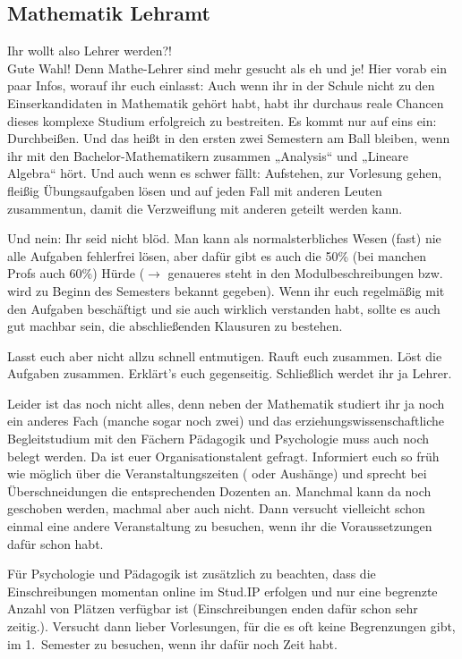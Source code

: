 \subsection{Mathematik Lehramt}

Ihr wollt also Lehrer werden?!\\
Gute Wahl! Denn Mathe-Lehrer sind mehr gesucht als eh und je! 
Hier vorab ein paar Infos, worauf ihr euch einlasst: Auch wenn ihr in der Schule nicht zu den Einserkandidaten in Mathematik gehört habt, habt ihr durchaus reale Chancen dieses komplexe Studium erfolgreich zu bestreiten.
Es kommt nur auf eins ein: Durchbeißen.
Und das heißt in den ersten zwei Semestern am Ball bleiben, wenn ihr mit den Bachelor-Mathematikern zusammen „Analysis“ und „Lineare Algebra“ hört.
Und auch wenn es schwer fällt:
Aufstehen, zur Vorlesung gehen, fleißig Übungsaufgaben lösen und auf jeden Fall mit anderen Leuten zusammentun, damit die Verzweiflung mit anderen geteilt werden kann.

Und nein: Ihr seid nicht blöd.
Man kann als normalsterbliches Wesen (fast) nie alle Aufgaben fehlerfrei lösen, aber dafür gibt es auch die 50\% (bei manchen Profs auch 60\%) Hürde ($\rightarrow$  genaueres steht in den Modulbeschreibungen bzw. wird zu Beginn des Semesters bekannt gegeben).
Wenn ihr euch regelmäßig mit den Aufgaben beschäftigt und sie auch wirklich verstanden habt, sollte es auch gut machbar sein, die abschließenden Klausuren zu bestehen.

Lasst euch aber nicht allzu schnell entmutigen.
Rauft euch zusammen.
Löst die Aufgaben zusammen.
Erklärt’s euch gegenseitig.
Schließlich werdet ihr ja Lehrer.

Leider ist das noch nicht alles, denn neben der Mathematik studiert ihr ja noch ein anderes Fach (manche sogar noch zwei) und das erziehungswissenschaftliche Begleitstudium mit den Fächern Pädagogik und Psychologie muss auch noch belegt werden.
Da ist euer Organisationstalent gefragt.
Informiert euch so früh wie möglich über die Veranstaltungszeiten ( oder Aushänge) und sprecht bei Überschneidungen die entsprechenden Dozenten an.
Manchmal kann da noch geschoben werden, machmal aber auch nicht.
Dann versucht vielleicht schon einmal eine andere Veranstaltung zu besuchen, wenn ihr die Voraussetzungen dafür schon habt.

Für Psychologie und Pädagogik ist zusätzlich zu beachten, dass die Einschreibungen momentan online im Stud.IP erfolgen und nur eine begrenzte Anzahl von Plätzen verfügbar ist (Einschreibungen enden dafür schon sehr zeitig.).
Versucht dann lieber Vorlesungen, für die es oft keine Begrenzungen gibt, im 1.~Semester zu besuchen, wenn ihr dafür noch Zeit habt.

